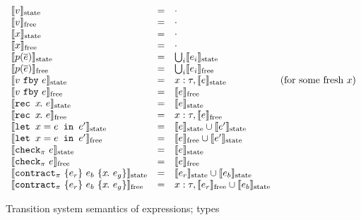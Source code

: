 
\newcommand{\sysinit}[1]{\systrans{#1}_{\text{init}}}
\newcommand{\sysvalue}[1]{\systrans{#1}_{\text{value}}}
\newcommand{\sysupdate}[1]{\systrans{#1}_{\text{update}}}
\newcommand{\sysrely}[1]{\systrans{#1}_{\text{rely}}}
\newcommand{\sysguar}[1]{\systrans{#1}_{\text{guar}}}
\newcommand{\xctr}{\xcontractP{\PStatus}{e_r}{e_b}{\rawbind{x}{e_g}}}

\newcommand{\sysstate}[1]{\systrans{#1}_{\text{state}}}
\newcommand{\sysoracle}[1]{\systrans{#1}_{\text{free}}}

\begin{figure}
  \[
  \begin{array}{lrlr}
    \sysstate{v} & = & \cdot \\
    \sysoracle{v} & = & \cdot \\
    \sysstate{x} & = & \cdot \\
    \sysoracle{x} & = & \cdot \\
    \sysstate{p(\ov{e})} & = & \bigcup_i \sysstate{e_i} \\
    \sysoracle{p(\ov{e})} & = & \bigcup_i \sysoracle{e_i} \\

    \sysstate{\xfby{v}{e}} & = & x: \tau, \sysstate{e} & \text{(for some fresh $x$)} \\
    \sysoracle{\xfby{v}{e}} & = & \sysoracle{e} \\

    \sysstate{\xrec{x}{e}} & = & \sysstate{e} \\
    \sysoracle{\xrec{x}{e}} & = & x: \tau, \sysoracle{e} \\

    \sysstate{\xlet{x}{e}{e'}} & = & \sysstate{e} \cup \sysstate{e'} \\
    \sysoracle{\xlet{x}{e}{e'}} & = & \sysoracle{e} \cup \sysstate{e'} \\

    \sysstate{\xcheckP{\PStatus}{e}} & = & \sysstate{e} \\
    \sysoracle{\xcheckP{\PStatus}{e}} & = & \sysoracle{e} \\

    \sysstate{\xctr} & = & \sysstate{e_r} \cup \sysstate{e_b} \\
    \sysoracle{\xctr} & = & x: \tau, \sysoracle{e_r} \cup \sysstate{e_b} \\
  \end{array}
\]
\caption{Transition system semantics of expressions; types}
\label{f:system-translation-tys}
\end{figure}

